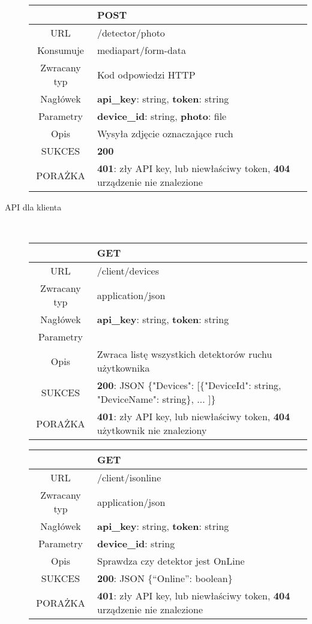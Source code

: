 \begin{description}
		\begin{tabularx}{\linewidth} {|c|X|}
		\hline
						& {\bf POST}\\ \hline
		  URL 			& /detector/photo\\
		  Konsumuje		& mediapart/form-data\\
		  Zwracany typ 	& Kod odpowiedzi HTTP\\
		  Nagłówek 		& {\bf api\_key}: string, {\bf token}: string\\
		  Parametry 	& {\bf device\_id}: string, {\bf photo}: file\\
		  Opis 			& Wysyła zdjęcie oznaczające ruch\\
		  SUKCES 		& {\bf 200}\\
		  PORAŻKA 		& {\bf 401}: zły API key, lub niewłaściwy token, {\bf 404} urządzenie nie znalezione\\
		  \hline
		\end{tabularx}
		
		\item[API dla klienta] \hfill \\
		
		\begin{tabularx}{\linewidth} {|c|X|}
		\hline
						& {\bf GET}\\ \hline
		  URL 			& /client/devices\\
		  Zwracany typ 	& application/json\\
		  Nagłówek 		& {\bf api\_key}: string, {\bf token}: string\\
		  Parametry 	& \\
		  Opis 			& Zwraca listę wszystkich detektorów ruchu użytkownika\\
		  SUKCES 		& {\bf 200}: JSON \{"Devices": [\{"DeviceId": string, "DeviceName": string\}, ... ]\}\\
		  PORAŻKA 		& {\bf 401}: zły API key, lub niewłaściwy token, {\bf 404} użytkownik nie znaleziony\\
		  \hline
		\end{tabularx}
		
		\begin{tabularx}{\linewidth} {|c|X|}
		\hline
						& {\bf GET}\\ \hline
		  URL 			& /client/isonline\\
		  Zwracany typ 	& application/json\\
		  Nagłówek 		& {\bf api\_key}: string, {\bf token}: string\\
		  Parametry 	& {\bf device\_id}: string\\
		  Opis 			& Sprawdza czy detektor jest OnLine\\
		  SUKCES 		& {\bf 200}: JSON \{``Online'': boolean\}\\
		  PORAŻKA 		& {\bf 401}: zły API key, lub niewłaściwy token, {\bf 404} urządzenie nie znalezione\\
		  \hline
		\end{tabularx}
		

\end{description}
